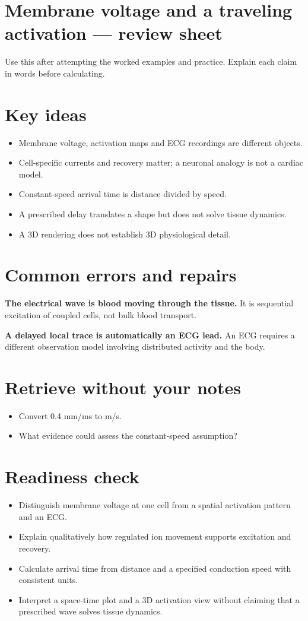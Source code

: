 \documentclass[11pt,letterpaper]{article}
\theoremstyle{definition}\newtheorem{definition}{Definition}\newtheorem{example}{Example}
\numberwithin{equation}{section}
\begin{document}
\section*{Membrane voltage and a traveling activation --- review sheet}
Use this after attempting the worked examples and practice. Explain each claim in words before calculating.

\section*{Key ideas}
\begin{itemize}
\item Membrane voltage, activation maps and ECG recordings are different objects.
\item Cell-specific currents and recovery matter; a neuronal analogy is not a cardiac model.
\item Constant-speed arrival time is distance divided by speed.
\item A prescribed delay translates a shape but does not solve tissue dynamics.
\item A 3D rendering does not establish 3D physiological detail.
\end{itemize}
\section*{Common errors and repairs}
\textbf{The electrical wave is blood moving through the tissue.} It is sequential excitation of coupled cells, not bulk blood transport.

\textbf{A delayed local trace is automatically an ECG lead.} An ECG requires a different observation model involving distributed activity and the body.

\section*{Retrieve without your notes}
\begin{itemize}
\item Convert 0.4 mm/ms to m/s.
\item What evidence could assess the constant-speed assumption?
\end{itemize}
\section*{Readiness check}
\begin{itemize}
\item Distinguish membrane voltage at one cell from a spatial activation pattern and an ECG.
\item Explain qualitatively how regulated ion movement supports excitation and recovery.
\item Calculate arrival time from distance and a specified conduction speed with consistent units.
\item Interpret a space-time plot and a 3D activation view without claiming that a prescribed wave solves tissue dynamics.
\end{itemize}
\end{document}
